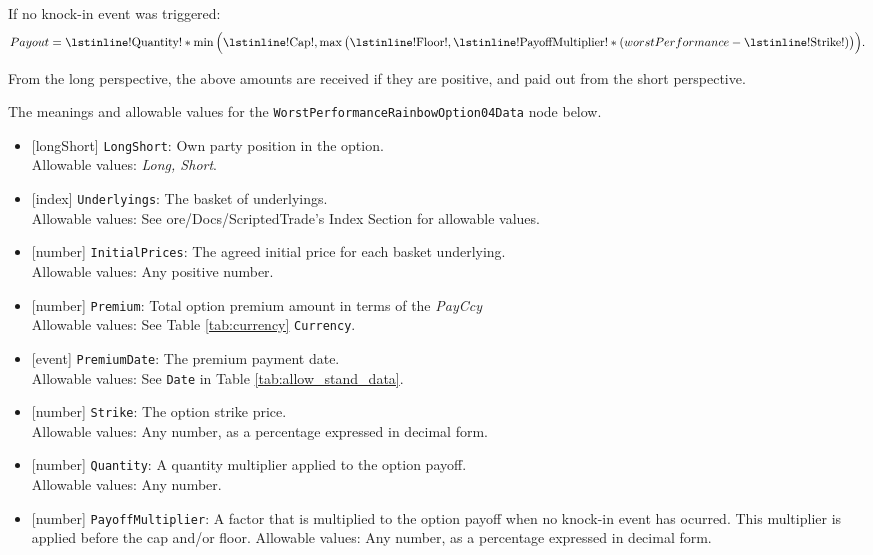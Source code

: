 If no knock-in event was triggered:
\begin{equation*}
  Payout = \text{\lstinline!Quantity!} * \min\Big(\text{\lstinline!Cap!}, \max\big(\text{\lstinline!Floor!}, \text{\lstinline!PayoffMultiplier!} * (worstPerformance - \text{\lstinline!Strike!})\big)\Big).
\end{equation*}

From the long perspective, the above amounts are received if they are positive,
and paid out from the short perspective.

The meanings and allowable values for the \lstinline!WorstPerformanceRainbowOption04Data! node below.

\begin{itemize} 
  \item{}[longShort] \lstinline!LongShort!: Own party position in the option. \\
  Allowable values: \emph{Long, Short}.
  \item{}[index] \lstinline!Underlyings!: The basket of underlyings. \\
  Allowable values: See ore/Docs/ScriptedTrade's Index Section for allowable values.
  \item{}[number] \lstinline!InitialPrices!: The agreed initial price for each basket underlying. \\
  Allowable values: Any positive number.
  \item{}[number] \lstinline!Premium!: Total option premium amount in terms of the \emph{PayCcy} \\
  Allowable values: See Table \ref{tab:currency} \lstinline!Currency!.
  \item{}[event] \lstinline!PremiumDate!: The premium payment date. \\
  Allowable values: See \lstinline!Date! in Table \ref{tab:allow_stand_data}.
  \item{}[number] \lstinline!Strike!: The option strike price. \\
  Allowable values: Any number, as a percentage expressed in decimal form.
  \item{}[number] \lstinline!Quantity!: A quantity multiplier applied to the option payoff. \\
  Allowable values: Any number.
  \item{}[number] \lstinline!PayoffMultiplier!: A factor that is multiplied to the option payoff when no knock-in event
  has ocurred. This multiplier is applied before the cap and/or floor.
  Allowable values: Any number, as a percentage expressed in decimal form.

\end{itemize}
